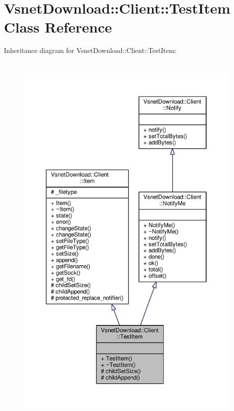 \hypertarget{classVsnetDownload_1_1Client_1_1TestItem}{}\section{Vsnet\+Download\+:\+:Client\+:\+:Test\+Item Class Reference}
\label{classVsnetDownload_1_1Client_1_1TestItem}


Inheritance diagram for Vsnet\+Download\+:\+:Client\+:\+:Test\+Item\+:
\nopagebreak
\begin{figure}[H]
\begin{center}
\leavevmode
\includegraphics[height=550pt]{de/d91/classVsnetDownload_1_1Client_1_1TestItem__inherit__graph}
\end{center}
\end{figure}


